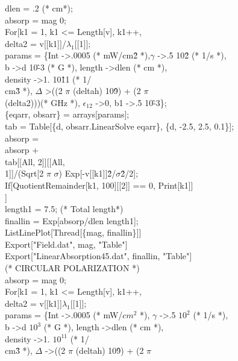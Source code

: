 dlen = .2 (* cm*);\\
absorp = mag 0;\\
For[k1 = 1, k1 \textless= Length[v], k1++,\\
 delta2 = v[[k1]]/$\lambda_1$[[1]];\\
 params = \{Int -\textgreater .0005 (* mW/cm\^2 *),$\gamma$ -\textgreater .5 10\^2 (* 1/s *), \\
   b -\textgreater d 10\^ -3 (* G *), length -\textgreater dlen (* cm *), \\
   density -\textgreater 1. 10\^ 11 (* 1/ \\
   cm\^ 3 *), $\Delta$ \textgreater((2 $\pi$ (deltah) 10\^9) + (2 $\pi$ \ \\
(delta2)))(* GHz *), $\epsilon_{12}$ -\textgreater 0, b1 -\textgreater  .5 10\^-3\}; \\
 \{eqarr, obsarr\} = arrays[params];\\
   tab = Table[\{d, obsarr.LinearSolve \@\@ eqarr\}, \{d, -2.5, 2.5, 0.1\}];\\
 absorp = \\
  absorp + \\
   tab[[All, 2]][[All, \\
      1]]/(Sqrt[2 $\pi$ $\sigma$) Exp[-v[[k1]]\^2/$\sigma$\^ 2/2];\\
 If[QuotientRemainder[k1, 100][[2]] == 0, Print[k1]]\\
 ]\\
length1 = 7.5; (* Total length*)\\
finallin = Exp[absorp/dlen length1];\\
ListLinePlot[Thread[\{mag, finallin\}]]\\
Export["Field.dat", mag, "Table"]\\
Export["LinearAbsorption45.dat", finallin, "Table"]\\
(*  CIRCULAR POLARIZATION *)\\
absorp = mag 0;\\
For[k1 = 1, k1 \textless = Length[v], k1++,\\
 delta2 = v[[k1]]$\lambda_1$[[1]];\\
 params = \{Int -\textgreater .0005 (* mW/$cm^2$ *), $\gamma$ -\textgreater .5 $10^2$ (* 1/s *), \\
   b -\textgreater d $10^3$ (* G *), length -\textgreater dlen (* cm *), \\
   density -\textgreater 1. $10^11$ (* 1/ \\
   cm\^3 *), $\Delta$ -\textgreater ((2 $\pi$ (deltah) 10\^9) + (2 $\pi$ \ \\
